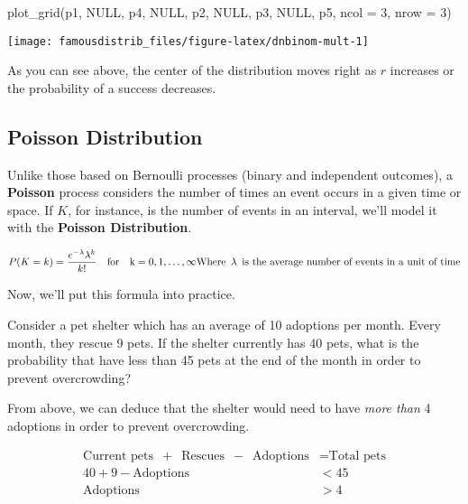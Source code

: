 \documentclass[
]{article}
\newenvironment{Shaded}{\begin{snugshade}}{\end{snugshade}}
\newcommand{\AttributeTok}[1]{\textcolor[rgb]{0.77,0.63,0.00}{#1}}
\newcommand{\ConstantTok}[1]{\textcolor[rgb]{0.00,0.00,0.00}{#1}}
\newcommand{\DecValTok}[1]{\textcolor[rgb]{0.00,0.00,0.81}{#1}}
\newcommand{\FunctionTok}[1]{\textcolor[rgb]{0.00,0.00,0.00}{#1}}
\newcommand{\NormalTok}[1]{#1}
\begin{document}
\begin{Shaded}
\begin{Highlighting}[]
\FunctionTok{plot\_grid}\NormalTok{(p1, }\ConstantTok{NULL}\NormalTok{, p4, }\ConstantTok{NULL}\NormalTok{, p2, }\ConstantTok{NULL}\NormalTok{, p3, }\ConstantTok{NULL}\NormalTok{, p5, }\AttributeTok{ncol =} \DecValTok{3}\NormalTok{, }\AttributeTok{nrow =} \DecValTok{3}\NormalTok{)}
\end{Highlighting}
\end{Shaded}

\begin{center}\texttt{[image: famousdistrib\_files/figure-latex/dnbinom-mult-1]} \end{center}

As you can see above, the center of the distribution moves right as \(r\) increases or the probability of a success decreases.

\hypertarget{Poisson}{%
\subsection{Poisson Distribution}\label{Poisson}}

Unlike those based on Bernoulli processes (binary and independent outcomes), a \textbf{Poisson} process considers the number of times an event occurs in a given time or space. If \(K\), for instance, is the number of events in an interval, we'll model it with the \textbf{Poisson Distribution}.

\[
P(K=k) = \frac{e^{-\lambda}\lambda^k}{k!} \quad \textrm{for} \quad \mathrm{k} = 0, 1, \ldots, \infty \\
\textrm{Where} \enspace \lambda \enspace \textrm{is the average number of events in a unit of time}
\]

Now, we'll put this formula into practice.

Consider a pet shelter which has an average of 10 adoptions per month. Every month, they rescue 9 pets. If the shelter currently has 40 pets, what is the probability that have less than 45 pets at the end of the month in order to prevent overcrowding?

From above, we can deduce that the shelter would need to have \emph{more than} 4 adoptions in order to prevent overcrowding.

\[ \begin{split} \textrm{Current pets} \enspace + \enspace \textrm{Rescues} \enspace - \enspace \textrm{Adoptions} &= \textrm{Total pets} \\ 40 + 9 - \textrm{Adoptions} &<45 \\ \textrm{Adoptions} &> 4 \end{split} \]
\end{document}
